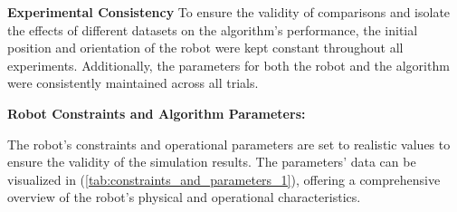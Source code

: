 \vspace*{6mm}  

\textbf{Experimental Consistency}
To ensure the validity of comparisons and isolate the effects of different datasets on the algorithm's performance, the initial position and orientation of the robot were kept constant throughout all experiments. Additionally, the parameters for both the robot and the algorithm were consistently maintained across all trials.


\vspace*{6mm}  

\textbf{Robot Constraints and Algorithm Parameters: } 


The robot's constraints and operational parameters are set to realistic values to ensure the validity of the simulation results. The parameters' data can be visualized in (\autoref{tab:constraints_and_parameters_1}), offering a comprehensive overview of the robot's physical and operational characteristics.

